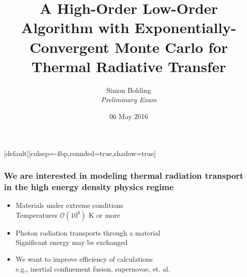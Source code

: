 \documentclass[xcolor=dvipsnames,hyperref={pdfpagelabels=false},unknownkeysallowed]{beamer}
\title[HOLO for TRT]{A High-Order Low-Order Algorithm with Exponentially-Convergent Monte Carlo for
    Thermal Radiative Transfer}
\author[S.R. Bolding]{{Simon Bolding \\ \vspace{1.0em}\emph{Preliminary Exam}}}
\date{{06 May 2016} }
\newcommand{\colb}[1]{{\color{blue} #1}}
\newcommand{\colG}[1]{{\color{Gray!110} #1}}
\newlength{\wideitemsep}
\let\olditem\item
\renewcommand{\item}{\setlength{\itemsep}{\wideitemsep}\olditem}
\begin{document}
[default][colsep=-4bp,rounded=true,shadow=true]

\def\beginpage{\null\vfill\bgroup
\offinterlineskip\leftskip=\z@}
\def\endpage{\egroup\eject}

\begin{frame}
    \titlepage \vspace{-0.213in}
    \begin{center}
    \end{center}    
\end{frame}

\setlength{\tabcolsep}{6pt}



\begin{frame}
\frametitle{We are interested in modeling thermal radiation transport \\ in the high energy
    density physics regime}
    \addtolength{\wideitemsep}{0.08in}
\begin{itemize}
    \item[] Materials under extreme conditions \\ \colG{Temperatures $\mathcal{O}(10^6)$ K or more}
    \item[] Photon radiation transports through a material \\ 
        \colG{Significant \colb{energy}  may be exchanged}
 \item[] We want to improve efficiency of calculations \\
     \colG{e.g., inertial confinement fusion, supernovae, et. al.}
    \end{itemize}
\end{frame}
\end{document}
